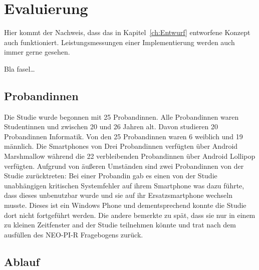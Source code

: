 
\chapter{Evaluierung}
\label{ch:Evaluierung}
Hier kommt der Nachweis, dass das in Kapitel~\ref{ch:Entwurf}
entworfene Konzept auch funktioniert. Leistungsmessungen einer
Implementierung werden auch immer gerne gesehen.

Bla fasel\ldots

\section{Probandinnen}
\label{ch:Evaluierung:sec:Abschnitt1}

Die Studie wurde begonnen mit 25 Probandinnen.
Alle Probandinnen waren Studentinnen und zwischen 20 und 26 Jahren alt.
Davon studieren 20 Probandinnen Informatik. 
Von den 25 Probandinnen waren 6 weiblich und 19 männlich.
Die Smartphones von Drei Probandinnen verfügten über Android Marshmallow während die 22 verbleibenden Probandinnen über Android Lollipop verfügten.  
Aufgrund von äußeren Umständen sind zwei Probandinnen von der Studie zurücktreten:
Bei einer Probandin gab es einen von der Studie unabhängigen kritischen Systemfehler auf ihrem Smartphone was dazu führte, dass dieses unbenutzbar wurde und sie auf ihr Ersatzsmartphone wechseln musste.
Dieses ist ein Windows Phone und dementsprechend konnte die Studie dort nicht fortgeführt werden.
Die andere bemerkte zu spät, dass sie nur in einem zu kleinen Zeitfenster and der Studie teilnehmen könnte und trat nach dem ausfüllen des NEO-PI-R Fragebogens zurück.


\section{Ablauf}
\label{ch:Entwurf:sec:Abschnitt2}

